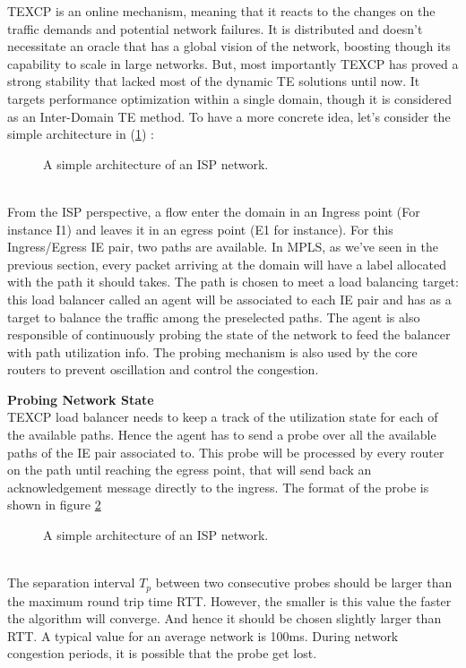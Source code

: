 TEXCP is an online mechanism, meaning that it reacts to the changes on the traffic demands and potential network failures. It is distributed and doesn't necessitate an oracle that has a global vision of the network, boosting though its capability to scale in large networks. But, most importantly TEXCP has proved a strong stability that lacked most of the dynamic TE solutions until now. 
It targets performance optimization within a single domain, though it is considered as an Inter-Domain TE method. To have a more concrete idea, let's consider the simple architecture in (\ref{fig:texcp1}) :
\begin{figure}[h]
 \begin{center}

\caption{
   A simple architecture of an ISP network.
    \label{fig:texcp1}
}
\end{center}
\end{figure}
\\ From the ISP perspective, a flow enter the domain in an Ingress point (For instance I1) and leaves it in an egress point (E1 for instance). For this Ingress/Egress IE pair, two paths are available. In MPLS, as we've seen in the previous section, every packet arriving at the  domain will have a label allocated with the path it should takes. The path is chosen to meet a load balancing target: this load balancer called an agent will be associated to each IE pair and has as a target to balance the traffic among the preselected paths. The agent is also responsible of continuously probing the state of the network to feed the balancer with path utilization info. The probing mechanism is also used by the core routers to prevent oscillation and control the congestion.

{\bf Probing Network State}
\\ TEXCP load balancer needs to keep a track of the utilization state for each of the available paths. Hence the agent has to send a probe over all the available paths of  the IE pair associated to.  This probe will be processed by every router on the path until reaching the egress point, that will send back an acknowledgement message directly to the ingress. The format of the probe is shown in figure \ref{fig:texcp2}
\begin{figure}[h]
 \begin{center}
\caption{
   A simple architecture of an ISP network.
    \label{fig:texcp2}
}
\end{center}
\end{figure}
\\ The separation interval $T_p$ between two consecutive probes should be larger than the maximum round trip time RTT. However, the smaller is this value the faster the algorithm will converge. And hence it should be chosen slightly larger than RTT. A typical value for an average network is 100ms. During network congestion periods, it is possible that the probe get lost.

